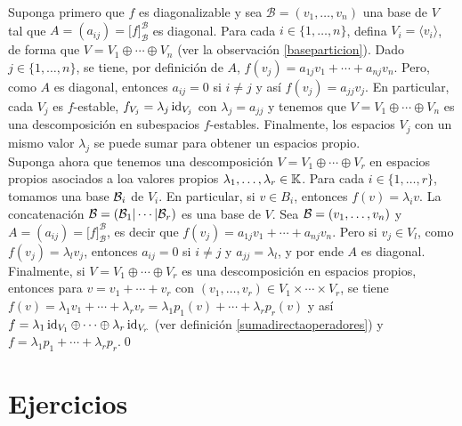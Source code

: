 \dem Suponga primero que $f$ es diagonalizable y sea $\mathcal{B}=(v_1,\ldots,v_n)$ una base de $V$ tal que $A=(a_{ij})=\Big[f\Big]^{\mathcal{B}}_{\mathcal{B}}$ es diagonal. Para cada $i\in\{1,\ldots,n\}$, defina $V_i=\langle v_i\rangle$, de forma que $V=V_1\oplus\cdots\oplus V_n$ (ver la observación \ref{baseparticion}). Dado $j\in\{1,\ldots,n\}$, se tiene, por definición de $A$, $f(v_j)=a_{1j}v_1+\cdots+a_{nj}v_n$. Pero, como $A$ es diagonal, entonces $a_{ij}=0$ si $i\ne j$ y así $f(v_j)=a_{jj}v_j$. En particular, cada $V_j$ es $f$-estable, $f_{V_j}=\lambda_j\operatorname{id}_{V_j}$ con $\lambda_j=a_{jj}$ y tenemos que $V=V_1\oplus\cdots\oplus V_n$ es una descomposición en subespacios $f$-estables. Finalmente, los espacios $V_j$ con un mismo valor $\lambda_j$ se puede sumar para obtener un espacios propio.\\
Suponga ahora que tenemos una descomposición $V=V_1\oplus\cdots\oplus V_r$ en espacios propios asociados a loa valores propios $\lambda_1,\ldots,\lambda_r\in\mathbb{K}$. Para cada $i\in\{1,\ldots,r\}$, tomamos una base $\mathcal{B}_i$ de $V_i$. En particular, si $v\in B_i$, entonces $f(v)=\lambda_iv$. La concatenación $\mathcal{B}=\left(\mathcal{B}_1|\cdots|\mathcal{B}_r\right)$ es una base de $V$. Sea $\mathcal{B}=(v_1,\ldots,v_n)$ y $A=(a_{ij})=\Big[f\Big]^{\mathcal{B}}_{\mathcal{B}}$, es decir que $f(v_j)=a_{1j}v_1+\cdots+a_{nj}v_n$. Pero si $v_j\in V_l$, como $f(v_j)=\lambda_lv_j$, entonces $a_{ij}=0$ si $i\ne j$ y $a_{jj}=\lambda_l$, y por ende $A$ es diagonal.\\
Finalmente, si $V=V_1\oplus\cdots\oplus V_r$ es una descomposición en espacios propios, entonces para $v=v_1+\cdots+v_r$ con $(v_1,\ldots,v_r)\in V_1\times\cdots\times V_r$, se tiene $f(v)=\lambda_1v_1+\cdots+\lambda_rv_r = \lambda_1p_1(v)+\cdots+\lambda_rp_r(v)$ y así $f=\lambda_1\operatorname{id}_{V_1}\oplus\cdots\oplus\lambda_r\operatorname{id}_{V_r}$ (ver definición \ref{sumadirectaoperadores}) y $f=\lambda_1p_1+\cdots+\lambda_rp_r$.\qed

\section*{Ejercicios}\label{espacios_estables_ejercicios}

